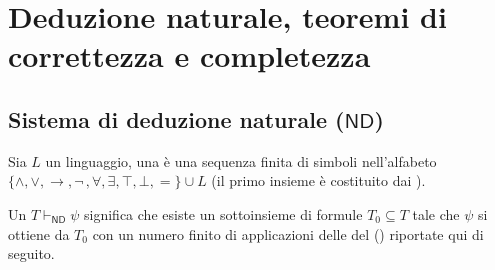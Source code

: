 \section{Deduzione naturale, teoremi di correttezza e completezza}
\subsection{\texorpdfstring{Sistema di deduzione naturale ($\mathsf{ND}$)}{Sistema di deduzione naturale (ND)}}

\begin{definition}
    Sia $L$ un linguaggio, una  è una sequenza finita di simboli nell'alfabeto $\{\land, \lor, \to, \neg \,, \forall, \exists, \top, \bot,=\} \cup L$ (il primo insieme è costituito dai ).
\end{definition}

\begin{definition}
    Un  $T \vdash_{\mathsf{ND}} \psi$ significa che esiste un sottoinsieme di formule $T_0 \subseteq T$ tale che
    $\psi$ si ottiene da $T_0$ con un numero finito di applicazioni delle  del  () riportate qui di seguito.
\end{definition}

